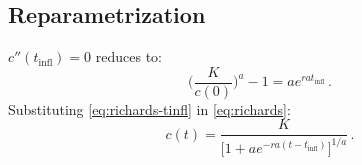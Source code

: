 \documentclass[12pt]{article}
\begin{document}
\subsection{Reparametrization}

$c''(t_\text{infl}) = 0$ reduces to:
%
\begin{equation}
  \label{eq:richards-tinfl}
  \bigg(\frac{K}{c(0)}\bigg)^a - 1 = a e^{r a t_\text{infl}}\,.
\end{equation}
%
Substituting \eqref{eq:richards-tinfl} in \eqref{eq:richards}:
%
\begin{equation}
  c(t) = \frac{K}{\big[1 + a e^{-r a (t - t_\text{infl})}\big]^{1/a}}\,.
\end{equation}
\end{document}
